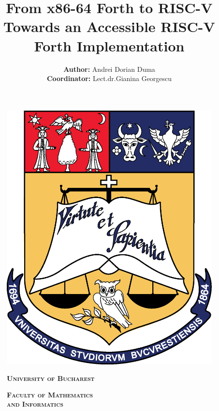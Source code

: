 \documentclass[a4paper,12pt,final]{article}
\author{\vspace{1cm} \textbf{Author:} Andrei Dorian Duma \\\vspace{0.1cm} \textbf{Coordinator:} Lect.\hspace{0.18cm}dr.\hspace{0.18cm}Gianina Georgescu \vspace{5cm}}
\affil{Master of Distributed Systems \\\vspace{0.3cm} September 2024}
\date{}
\title{From x86-64 Forth to RISC-V\\\medskip
\large Towards an Accessible RISC-V Forth Implementation }
\begin{document}
\begin{figure}[!htb]
    \centering
    \vspace{3cm}
    \begin{minipage}{0.16\textwidth}
        \includegraphics[width=\linewidth]{img/logo-ub.png}
    \end{minipage}
    \begin{minipage}{0.6\textwidth}
        \large
        \begin{center}
            \textbf{
                \textsc{
                    \hspace{0.015cm} University of Bucharest}}
        \end{center}
        \begin{center}
            \textbf{
                \textsc{
                Faculty of Mathematics \\
                \hspace{0.45cm} and Informatics}}
        \end{center}

\end{minipage}
\end{figure}
\end{document}
